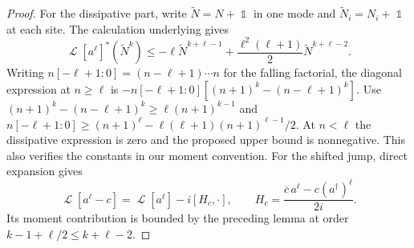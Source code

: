\documentclass[11pt]{article}
\theoremstyle{myplain}
\theoremstyle{mydefinition}
\theoremstyle{remark}
\DeclareMathOperator{\cL}{\mathcal{L}}
\DeclareMathOperator{\1}{\mathds{1}}
\begin{document}
        \begin{proof}
            For the dissipative part, write $\widetilde N=N+\1$ in one mode and $\widetilde N_i=N_i+\1$ at each site. The calculation underlying \cite[Lem.~4.3]{Gondolf.2024} gives
            \begin{equation}\label{eq:pure-loss-core-coercivity}
                \cL[a^\ell]^*(\widetilde N^k)
                \le-\ell \widetilde N^{k+\ell-1}
                +\frac{\ell^2(\ell+1)}2 \widetilde N^{k+\ell-2}.
            \end{equation}
            Writing $n[-\ell+1:0] = (n-\ell+1)\cdots n$ for the falling factorial, the diagonal expression at $n\ge\ell$ is $-n[-\ell+1:0][(n+1)^k-(n-\ell+1)^k]$. Use $(n+1)^k-(n-\ell+1)^k\ge\ell(n+1)^{k-1}$ and $n[-\ell+1:0]\ge(n+1)^\ell-\ell(\ell+1)(n+1)^{\ell-1}/2$. At $n<\ell$ the dissipative expression is zero and the proposed upper bound is nonnegative. This also verifies the constants in our moment convention. For the shifted jump, direct expansion gives
            \begin{equation}
                \cL[a^\ell-c]
                =\cL[a^\ell]-i[H_c,\cdot],\qquad
                H_c=\frac{\overline c\,a^\ell-c(a^\dagger)^\ell}{2i}.
            \end{equation}
            Its moment contribution is bounded by the preceding lemma at order $k-1+\ell/2\le k+\ell-2$.


\end{proof}
\end{document}
